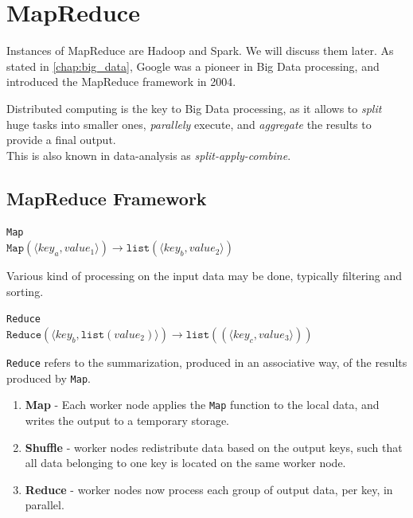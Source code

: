 \chapter{MapReduce}
\label{chap:mapreduce}

Instances of MapReduce are Hadoop and Spark. We will discuss them later.
As stated in \autoref{chap:big_data}, Google was a pioneer in Big Data processing, and introduced the MapReduce framework in 2004.

Distributed computing is the key to Big Data processing, as it allows to \textit{split} huge tasks into smaller ones, \textit{parallely} execute, and \textit{aggregate} the results to provide a final output.\\
This is also known in data-analysis as \textit{split-apply-combine}.

\section{MapReduce Framework}

\begin{paracol}{2}
   \begin{center}
      \texttt{Map}\\
      $\texttt{Map}(\langle key_a, value_1 \rangle) \rightarrow \texttt{list}(\langle key_b, value_2\rangle)$
   \end{center}
   Various kind of processing on the input data may be done, typically filtering and sorting.
   \switchcolumn
   \begin{center}
      \texttt{Reduce}\\
      $\texttt{Reduce}(\langle key_b, \texttt{list}(value_2)\rangle) \rightarrow \texttt{list}((\langle key_c,value_3\rangle))$
   \end{center}
   \texttt{Reduce} refers to the summarization, produced in an associative way, of the results produced by \lstinline|Map|.
\end{paracol}

\begin{enumerate}
   \item \textbf{Map} - Each worker node applies the \lstinline|Map| function to the local data, and writes the output to a temporary storage.
   \item \textbf{Shuffle} - worker nodes redistribute data based on the output keys, such that all data belonging to one key is located on the same worker node.
   \item \textbf{Reduce} - worker nodes now process each group of output data, per key, in parallel.
\end{enumerate}

